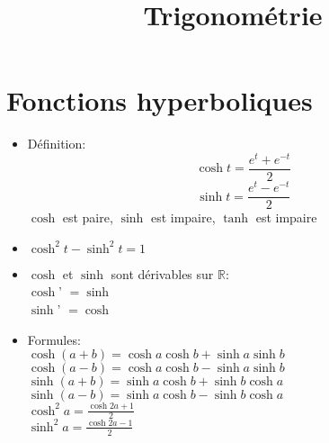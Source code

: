 \documentclass{article}
\title{Trigonom\'{e}trie}
\date{}
\begin{document}
\maketitle

\section{Fonctions hyperboliques}
\begin{itemize}
	\item D\'{e}finition:
	$$ \cosh t = \frac{e^t + e^{-t}}{2} $$
	$$ \sinh t = \frac{e^t - e^{-t}}{2} $$
	$\cosh$ est paire, $\sinh$ est impaire, $\tanh$ est impaire
	\item $ \cosh^2 t - \sinh^2 t = 1 $
	\item $\cosh$ et $\sinh$ sont d\'{e}rivables sur $\mathbb{R}$: \\
	$\cosh$' $ = \sinh$ \\
	$\sinh$' $ = \cosh$
	\newline
	\item Formules: \\
	$\cosh (a+b) = \cosh a\cosh b + \sinh a\sinh b$ \\
	$\cosh (a-b) = \cosh a\cosh b - \sinh a\sinh b$ \\
	$\sinh (a+b) = \sinh a\cosh b + \sinh b\cosh a$ \\
	$\sinh (a-b) = \sinh a\cosh b - \sinh b\cosh a$ \\
	$\cosh^2 a = \frac{\cosh 2a + 1}{2}$ \\
	$\sinh^2 a = \frac{\cosh 2a - 1}{2}$
\end{itemize}
\end{document}
